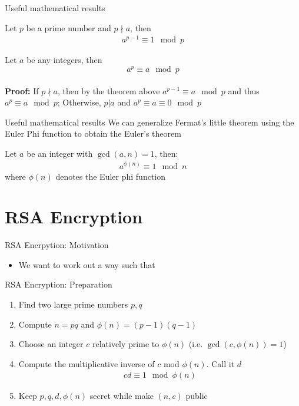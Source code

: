 \documentclass[10pt,xcolor={table,dvipsnames},t]{beamer}
\begin{document}
\begin{frame}{Useful mathematical results}
  \begin{theorem}
    Let $p$ be a prime number and $p\nmid a$, then
    \begin{align*}
      a^{p-1} \equiv 1 \mod p
    \end{align*}
  \end{theorem}
  \begin{corollary}
    Let $a$ be any integers, then $$a^p \equiv a \mod p$$\\
    \textbf{Proof:} If $p\nmid a$, then by the theorem above $a^{p-1} \equiv a \mod p$ and thus $a^p \equiv a \mod p$; Otherwise, $p|a$ and $a^{p} \equiv a \equiv 0 \mod p$
    
  \end{corollary}
\end{frame}

\begin{frame}{Useful mathematical results}
  We can generalize Fermat's little theorem using the Euler Phi function to obtain the Euler's theorem
  \begin{theorem}
    Let $a$ be an integer with $\gcd(a,n) = 1$, then:
    \begin{align*}
      a^{\phi(n)} \equiv 1 \mod n
    \end{align*}
    where $\phi(n)$ denotes the Euler phi function
  \end{theorem}
\end{frame}


\section{RSA Encryption}
\begin{frame}{RSA Encrpytion: Motivation}
  \begin{itemize}
    \item We want to work out a way such that 
  \end{itemize}
\end{frame}

\begin{frame}{RSA Encryption: Preparation}
  \begin{enumerate}
    \item Find two large prime numbers $p,q$ 
    \item Compute $n=pq$ and $\phi(n) = (p-1)(q-1)$
    \item Choose an integer $c$ relatively prime to $\phi(n)$ (i.e. $\gcd(c,\phi(n))=1$)
    \item Compute the multiplicative inverse of $c$ mod $\phi(n)$. Call it $d$ 
    \begin{align*}
      cd \equiv 1 \mod \phi(n)
    \end{align*}
    \item Keep $p,q,d,\phi(n)$ secret while make $(n,c)$ public
  \end{enumerate}
\end{frame}
\end{document}
